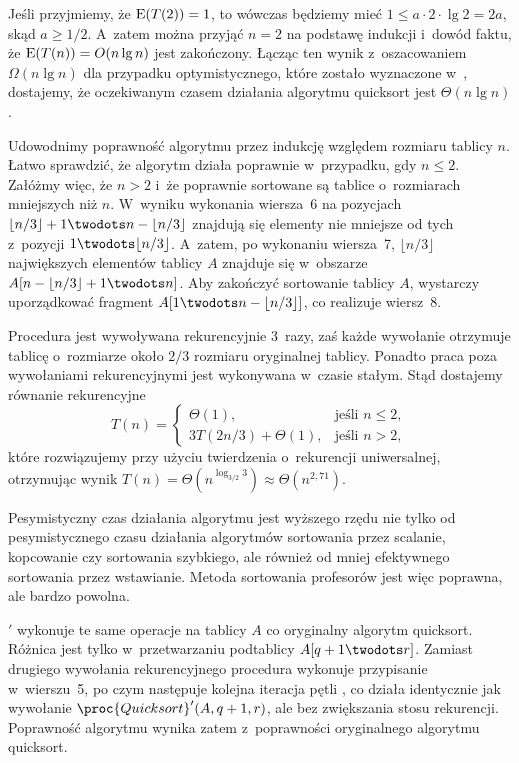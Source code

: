 Jeśli przyjmiemy, że $\operatorname{E}(T(2))=1$, to wówczas będziemy mieć $1\le a\cdot2\cdot\lg2=2a$, skąd $a\ge1/2$. A~zatem można przyjąć $n=2$ na podstawę indukcji i~dowód faktu, że $\operatorname{E}(T(n))=O(n\lg n)$ jest zakończony. Łącząc ten wynik z~oszacowaniem $\Omega(n\lg n)$ dla przypadku optymistycznego, które zostało wyznaczone w~, dostajemy, że oczekiwanym czasem działania algorytmu quicksort jest $\Theta(n\lg n)$.


\subproblem %
Udowodnimy poprawność algorytmu przez indukcję względem rozmiaru tablicy $n$. Łatwo sprawdzić, że algorytm działa poprawnie w~przypadku, gdy $n\le2$. Załóżmy więc, że $n>2$ i~że poprawnie sortowane są tablice o~rozmiarach mniejszych niż $n$. W~wyniku wykonania wiersza~6 na pozycjach $\lfloor n/3\rfloor+1\twodots n-\lfloor n/3\rfloor$ znajdują się elementy nie mniejsze od tych z~pozycji $1\twodots\lfloor n/3\rfloor$. A~zatem, po wykonaniu wiersza~7, $\lfloor n/3\rfloor$ największych elementów tablicy $A$ znajduje się w~obszarze $A[n-\lfloor n/3\rfloor+1\twodots n]$. Aby zakończyć sortowanie tablicy $A$, wystarczy uporządkować fragment $A[1\twodots n-\lfloor n/3\rfloor]$, co realizuje wiersz~8.

\subproblem %
Procedura jest wywoływana rekurencyjnie 3~razy, zaś każde wywołanie otrzymuje tablicę o~rozmiarze około $2/3$ rozmiaru oryginalnej tablicy. Ponadto praca poza wywołaniami rekurencyjnymi jest wykonywana w~czasie stałym. Stąd dostajemy równanie rekurencyjne
\[
	T(n) =
	\begin{cases}
		\Theta(1), & \text{jeśli $n\le2$}, \\
		3T(2n/3)+\Theta(1), & \text{jeśli $n>2$},
	\end{cases}
\]
które rozwiązujemy przy użyciu twierdzenia o~rekurencji uniwersalnej, otrzymując wynik $T(n)=\Theta(n^{\log_{3/2}3})\approx \Theta(n^{2{,}71})$.

\subproblem %
Pesymistyczny czas działania algorytmu  jest wyższego rzędu nie tylko od pesymistycznego czasu działania algorytmów sortowania przez scalanie, kopcowanie czy sortowania szybkiego, ale również od mniej efektywnego sortowania przez wstawianie. Metoda sortowania profesorów jest więc poprawna, ale bardzo powolna.


\subproblem %
$'$ wykonuje te same operacje na tablicy $A$ co oryginalny algorytm quicksort. Różnica jest tylko w~przetwarzaniu podtablicy $A[q+1\twodots r]$. Zamiast drugiego wywołania rekurencyjnego procedura wykonuje przypisanie w~wierszu~5, po czym następuje kolejna iteracja pętli , co działa identycznie jak wywołanie $\proc{Quicksort}'(A,q+1,r)$, ale bez zwiększania stosu rekurencji. Poprawność algorytmu wynika zatem z~poprawności oryginalnego algorytmu quicksort.

